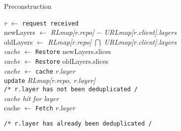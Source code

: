 \begin{algorithm}
\scriptsize 
	\caption{Preconstruction}
	\label{alg:prefetch}
		\emph{r} $\leftarrow$ \texttt{request received}\\
		{
			newLayers $\gets$ \emph{RLmap[r.repo]} $-$ \emph{URLmap[r.client].layers} \\
			oldLayers $\gets$ \emph{RLmap[r.repo]} $\bigcap$ \emph{URLmap[r.client].layers} \\
			
			
			\emph{cache} $\leftarrow$ \texttt{Restore} newLayers.slices \\%
			{ 
				\emph{cache} $\leftarrow$ \texttt{Restore} oldLayers.slices \\%
			}
		}
		{
				\emph{cache} $\leftarrow$ \texttt{cache} \emph{r.layer} \\
				\texttt{update} \emph{RLmap[r.repo, r.layer]} \\
		}
		{
			{\tiny\texttt{/* r.layer has not been deduplicated   /}} \\
				{
					\emph{cache hit for layer} \\
				} 
				{
					cache $\gets$ \texttt{Fetch} \emph{r.layer} 
				}
		}
		{
			{\tiny\texttt{/* r.layer has already been deduplicated   /}}
			
}
\end{algorithm}
